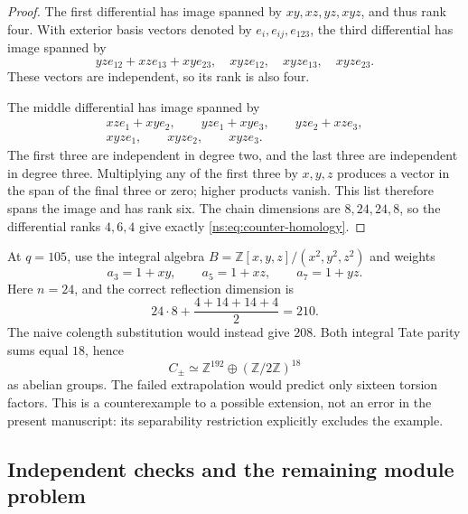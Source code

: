 \begin{proof}
The first differential has image spanned by $xy,xz,yz,xyz$, and thus rank
four. With exterior basis vectors denoted by $e_i,e_{ij},e_{123}$, the third
differential has image spanned by
\[
 yz e_{12}+xz e_{13}+xy e_{23},\quad
 xyz e_{12},\quad xyz e_{13},\quad xyz e_{23}.
\]
These vectors are independent, so its rank is also four.

The middle differential has image spanned by
\begin{gather*}
 xz e_1+xy e_2,\qquad yz e_1+xy e_3,\qquad yz e_2+xz e_3,\\
 xyz e_1,\qquad xyz e_2,\qquad xyz e_3.
\end{gather*}
The first three are independent in degree two, and the last three are
independent in degree three. Multiplying any of the first three by $x,y,z$
produces a vector in the span of the final three or zero; higher products
vanish. This list therefore spans the image and has rank six. The chain
dimensions are $8,24,24,8$, so the differential ranks $4,6,4$ give exactly
\eqref{ns:eq:counter-homology}.
\end{proof}

At $q=105$, use the integral algebra
$B=\mathbb Z[x,y,z]/(x^2,y^2,z^2)$ and weights
\[
 a_3=1+xy,\qquad a_5=1+xz,\qquad a_7=1+yz.
\]
Here $n=24$, and the correct reflection dimension is
\begin{equation}\label{ns:eq:counter-dimension}
 24\cdot8+\frac{4+14+14+4}{2}=210.
\end{equation}
The naive colength substitution would instead give $208$. Both integral
Tate parity sums equal $18$, hence
\begin{equation}\label{ns:eq:counter-smith}
 C_\pm\simeq\mathbb Z^{192}\oplus(\mathbb Z/2\mathbb Z)^{18}
\end{equation}
as abelian groups. The failed extrapolation would predict only sixteen
torsion factors. This is a counterexample to a possible extension, not an
error in the present manuscript: its separability restriction explicitly
excludes the example.

\subsection{Independent checks and the remaining module problem}

